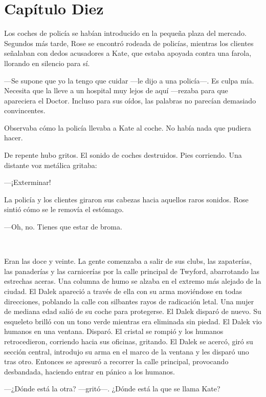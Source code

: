 \chapter*{Capítulo Diez}

Los coches de policía se habían introducido en la pequeña plaza del
mercado. Segundos más tarde, Rose se encontró rodeada de policías,
mientras los clientes señalaban con dedos acusadores a Kate, que estaba
apoyada contra una farola, llorando en silencio para sí.

---Se supone que yo la tengo que cuidar ---le dijo a una policía---. Es
culpa mía. Necesita que la lleve a un hospital muy lejos de aquí
---rezaba para que apareciera el Doctor. Incluso para sus oídos, las
palabras no parecían demasiado convincentes.

Observaba cómo la policía llevaba a Kate al coche. No había nada que
pudiera hacer.

De repente hubo gritos. El sonido de coches destruidos. Pies corriendo.
Una distante voz metálica gritaba:

---¡Exterminar!

La policía y los clientes giraron sus cabezas hacia aquellos raros
sonidos. Rose sintió cómo se le removía el estómago.

---Oh, no. Tienes que estar de broma.

~

Eran las doce y veinte. La gente comenzaba a salir de sus clubs, las
zapaterías, las panaderías y las carnicerías por la calle principal de
Twyford, abarrotando las estrechas aceras. Una columna de humo se alzaba
en el extremo más alejado de la ciudad. El Dalek apareció a través de
ella con su arma moviéndose en todas direcciones, poblando la calle con
silbantes rayos de radicación letal. Una mujer de mediana edad salió de
su coche para protegerse. El Dalek disparó de nuevo. Su esqueleto brilló
con un tono verde mientras era eliminada sin piedad. El Dalek vio
humanos en una ventana. Disparó. El cristal se rompió y los humanos
retrocedieron, corriendo hacia sus oficinas, gritando. El Dalek se
acercó, giró su sección central, introdujo su arma en el marco de la
ventana y les disparó uno tras otro. Entonces se apresuró a recorrer la
calle principal, provocando desbandada, haciendo entrar en pánico a los
humanos.

---¿Dónde está la otra? ---gritó---. ¿Dónde está la que se llama Kate?

~

